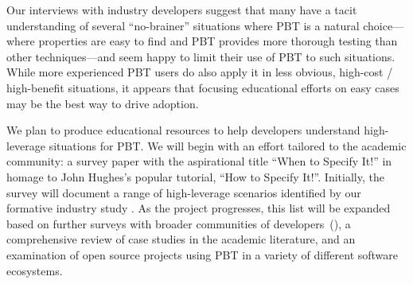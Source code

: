 {
%
Our interviews with industry developers suggest that many
have a tacit
understanding of several ``no-brainer'' situations where PBT is a natural
choice---where properties are easy to find and PBT provides
more thorough testing than other techniques---and
seem happy to limit their use of PBT to such situations.
While more experienced PBT users do also apply it in less obvious,
high-cost / high-benefit situations, it appears that
focusing educational efforts on easy cases may be the best way to
drive adoption.

We plan to produce educational resources to help developers understand
high-leverage situations for PBT. We will begin with an effort
tailored to the academic community: a survey paper with the
aspirational title ``When to Specify It!'' in homage to John Hughes's
popular tutorial, ``How to Specify It!''. Initially,
the survey will
document a  range of high-leverage scenarios identified by our formative
industry study%
.%
As the project progresses, this list will be expanded based on
further surveys with broader
communities of developers~(), a comprehensive
review of case studies in
the academic literature, and an examination of open source projects
using PBT in a
variety of different software ecosystems.

}
